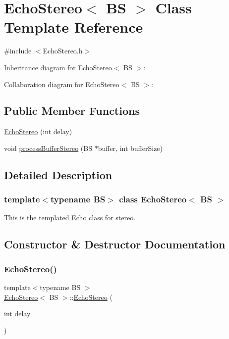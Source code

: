 \hypertarget{classEchoStereo}{}\section{Echo\+Stereo$<$ BS $>$ Class Template Reference}
\label{classEchoStereo}


{\ttfamily \#include $<$Echo\+Stereo.\+h$>$}



Inheritance diagram for Echo\+Stereo$<$ BS $>$\+:


Collaboration diagram for Echo\+Stereo$<$ BS $>$\+:
\subsection*{Public Member Functions}
\begin{DoxyCompactItemize}
\item 
\hyperlink{classEchoStereo_abee01097db3de683f2b6dbc82c7194f9}{Echo\+Stereo} (int delay)
\item 
void \hyperlink{classEchoStereo_a1b3ab691e0a48056f116d555a2fb969d}{process\+Buffer\+Stereo} (BS $\ast$buffer, int buffer\+Size)
\end{DoxyCompactItemize}


\subsection{Detailed Description}
\subsubsection*{template$<$typename BS$>$\newline
class Echo\+Stereo$<$ B\+S $>$}

This is the templated \hyperlink{classEcho}{Echo} class for stereo. 

\subsection{Constructor \& Destructor Documentation}
\mbox{\label{classEchoStereo_abee01097db3de683f2b6dbc82c7194f9}} 
\subsubsection{\texorpdfstring{Echo\+Stereo()}{EchoStereo()}}
{\footnotesize\ttfamily template$<$typename BS $>$ \\
\hyperlink{classEchoStereo}{Echo\+Stereo}$<$ BS $>$\+::\hyperlink{classEchoStereo}{Echo\+Stereo} (\begin{DoxyParamCaption}\item[{int}]{delay }\end{DoxyParamCaption})}

